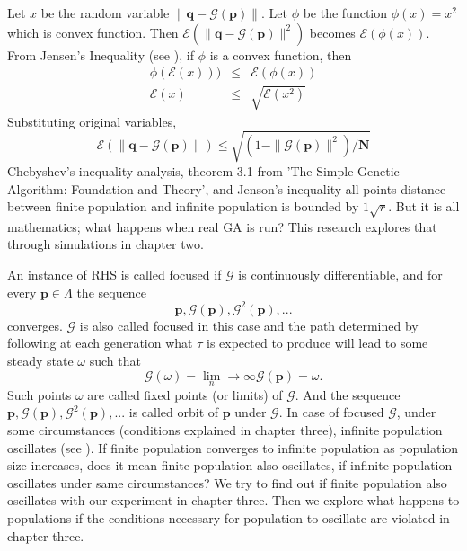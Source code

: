 Let $x$ be the random variable $\| \bm{q} - \mathcal{G}(\bm{p}) \|$. Let $\phi$ be the function $\phi (x) = x^2$ 
which is convex function. Then $\mathcal{E}(\| \bm{q} - \mathcal{G}(\bm{p}) \|^2)$ becomes $\mathcal{E}(\phi (x))$. 
From Jensen's Inequality (see \cite{JensenInequality}),
if $\phi$ is a convex function, then
\begin{eqnarray*}
\phi(\mathcal{E}(x))) & \leq & \mathcal{E}(\phi(x)) \\
\mathcal{E}(x) & \leq & \sqrt{\mathcal{E}(x^2)}
\end{eqnarray*}
Substituting original variables,
\begin{equation}
\label{convergenceRHS}
\mathcal{E}(\| \bm{q} - \mathcal{G}(\bm{p}) \|) \leq \sqrt{(1 - \|\mathcal{G}(\bm{p})\|^2) / \bm{N}}
\end{equation}
Chebyshev's inequality analysis, theorem 3.1 from 'The Simple Genetic Algorithm: Foundation and Theory', 
and Jenson's inequality all points distance between finite population and infinite population is bounded 
by $1\sqrt{r}$. But it is all mathematics; what happens when real GA is run? This research explores that 
through simulations in chapter two.

An instance of RHS is called focused if $\mathcal{G}$ is continuously differentiable, and for every $\bm{p}  \in  \Lambda$
the sequence
\[
\bm{p},  \mathcal{G}(\bm{p}),  {\mathcal{G}}^2(\bm{p}),...
\]
converges. $\mathcal{G}$ is also called focused in this case and the path determined by following at each generation what $\tau$ is expected 
to produce will lead to some steady state $\omega$ such that
\[
\mathcal{G}(\omega) = \lim_n\to\infty \mathcal{G}(\bm{p}) = \omega.
\]
Such points $\omega$ are called fixed points (or limits) of $\mathcal{G}$. 
And the sequence $\bm{p},  \mathcal{G}(\bm{p}),  {\mathcal{G}}^2(\bm{p}),...$ is called orbit of $\bm{p}$ under $\mathcal{G}$. 
In case of focused $\mathcal{G}$, under some circumstances (conditions explained in chapter three), 
infinite population oscillates (see \cite{Vose1999}). If finite population converges to infinite population as population size increases, 
does it mean finite population also oscillates, if infinite population oscillates under same circumstances? 
We try to find out if finite population also oscillates with our experiment in chapter three. Then we explore 
what happens to populations if the conditions necessary for population to oscillate are violated in chapter three.





